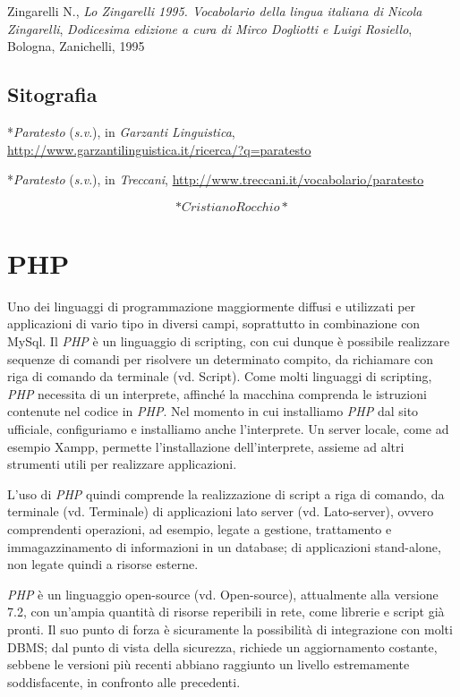 \documentclass[
  b5paper,
  twoside,
  12pt,
  chapterprefix=false,
  bibliography=totocnumbered,
  parskip=false]{scrbook}
\begin{document}
Zingarelli N., \emph{Lo Zingarelli 1995. Vocabolario della lingua italiana di
Nicola Zingarelli}, \emph{Dodicesima edizione a cura di Mirco Dogliotti e
Luigi Rosiello}, Bologna, Zanichelli, 1995

\hypertarget{sitografia-27}{%
\section*{Sitografia}\label{sitografia-27}}

*\emph{Paratesto} (\emph{s.v}.), in \emph{Garzanti Linguistica},
\url{http://www.garzantilinguistica.it/ricerca/?q=paratesto}

*\emph{Paratesto} (\emph{s.v}.), in \emph{Treccani},
\url{http://www.treccani.it/vocabolario/paratesto}

\[*Cristiano Rocchio*\]

\hypertarget{php}{%
\chapter{PHP}\label{php}}

Uno dei linguaggi di programmazione maggiormente diffusi e utilizzati
per applicazioni di vario tipo in diversi campi, soprattutto in
combinazione con MySql. Il \emph{PHP} è un linguaggio di scripting, con cui
dunque è possibile realizzare sequenze di comandi per risolvere un
determinato compito, da richiamare con riga di comando da terminale (vd.
Script). Come molti linguaggi di scripting, \emph{PHP} necessita di un
interprete, affinché la macchina comprenda le istruzioni contenute nel
codice in \emph{PHP}. Nel momento in cui installiamo \emph{PHP} dal sito
ufficiale, configuriamo e installiamo anche l'interprete. Un server
locale, come ad esempio Xampp, permette l'installazione dell'interprete,
assieme ad altri strumenti utili per realizzare applicazioni.

L'uso di \emph{PHP} quindi comprende la realizzazione di script a riga di
comando, da terminale (vd. Terminale) di applicazioni lato server (vd.
Lato-server), ovvero comprendenti operazioni, ad esempio, legate a
gestione, trattamento e immagazzinamento di informazioni in un database;
di applicazioni stand-alone, non legate quindi a risorse esterne.

\emph{PHP} è un linguaggio open-source (vd. Open-source), attualmente alla
versione 7.2, con un'ampia quantità di risorse reperibili in rete, come
librerie e script già pronti. Il suo punto di forza è sicuramente la
possibilità di integrazione con molti DBMS; dal punto di vista della
sicurezza, richiede un aggiornamento costante, sebbene le versioni più
recenti abbiano raggiunto un livello estremamente soddisfacente, in
confronto alle precedenti.
\end{document}
